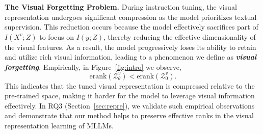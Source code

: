 \vspace{1em}\noindent\textbf{The Visual Forgetting Problem.} 
During instruction tuning, the visual representation undergoes significant compression as the model prioritizes textual supervision. 
This reduction occurs because the model effectively sacrifices part of $I(X^v; Z)$ to focus on $I(y; Z)$, thereby reducing the effective dimensionality of the visual features. 
As a result, the model progressively loses its ability to retain and utilize rich visual information, leading to a phenomenon we define as \textbf{\textit{visual forgetting}}.
Empirically, in Figure~\ref{fig:intro} we observe,
\begin{equation}\label{eq:erank_degradation}
    \text{erank}(\mathcal{Z}_\theta^v) < \text{erank}(\mathcal{Z}_0^v).
\end{equation}
This indicates that the tuned visual representation is compressed relative to the pre-trained space, making it harder for the model to leverage visual information effectively.
In RQ3 (Section~\ref{sec:repre}), we validate such empirical observations and demonstrate that our method helps to preserve effective ranks in the visual representation learning of MLLMs.












